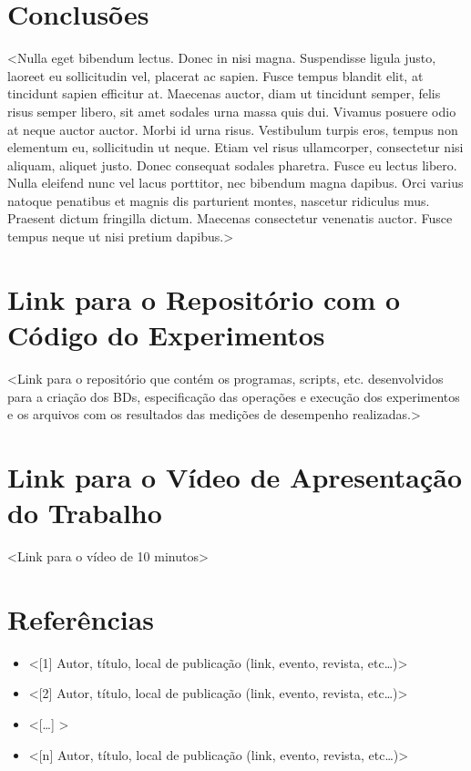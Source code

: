 \documentclass[12pt,a4paper]{article}
\begin{document}
\section{Conclusões}

<Nulla eget bibendum lectus. Donec in nisi magna. Suspendisse ligula justo, laoreet eu sollicitudin vel, placerat ac sapien. Fusce tempus blandit elit, at tincidunt sapien efficitur at. Maecenas auctor, diam ut tincidunt semper, felis risus semper libero, sit amet sodales urna massa quis dui. Vivamus posuere odio at neque auctor auctor. Morbi id urna risus. Vestibulum turpis eros, tempus non elementum eu, sollicitudin ut neque. Etiam vel risus ullamcorper, consectetur nisi aliquam, aliquet justo. Donec consequat sodales pharetra. Fusce eu lectus libero. Nulla eleifend nunc vel lacus porttitor, nec bibendum magna dapibus. Orci varius natoque penatibus et magnis dis parturient montes, nascetur ridiculus mus. Praesent dictum fringilla dictum. Maecenas consectetur venenatis auctor. Fusce tempus neque ut nisi pretium dapibus.>

\section{Link para o Repositório com o Código do Experimentos}

<Link para o repositório que contém os programas, scripts, etc. desenvolvidos para a criação dos BDs, especificação das operações e execução dos experimentos e os arquivos com os resultados das medições de desempenho realizadas.>

\section{Link para o Vídeo de Apresentação do Trabalho}

<Link para o vídeo de 10 minutos>

\section{Referências}

\begin{itemize}
    \item <{[}1{]} Autor, título, local de publicação (link, evento, revista, etc\dots)>  
    \item <{[}2{]} Autor, título, local de publicação (link, evento, revista, etc\dots)>  
    \item <{[}\dots{]} >  
    \item <{[}n{]} Autor, título, local de publicação (link, evento, revista, etc\dots)>
\end{itemize}
\end{document}
